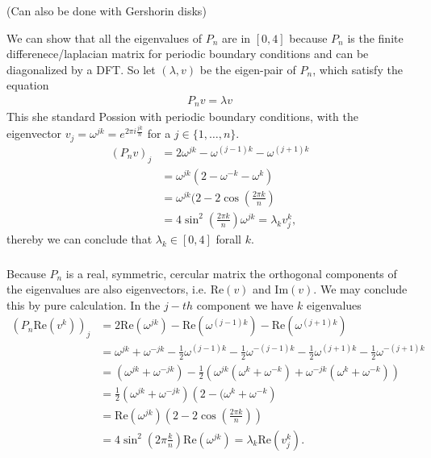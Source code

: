 \subsubsection{}
(Can also be done with Gershorin disks)
\newline

We can show that all the eigenvalues of $P_n$ are in $[0, 4]$ because $P_n$
is the finite differenece/laplacian matrix for periodic boundary conditions
and can be diagonalized by a DFT. So let $\left( \lambda, v \right)$ be the
eigen-pair of $P_n$, which satisfy the equation
\begin{align}
    P_n v = \lambda v
\end{align}
This she standard Possion with periodic boundary conditions, with the
eigenvector $v_j = \omega^{jk} = e^{2\pi i \frac{jk}{n}}$ for a $j \in
\{1,\ldots,n\}$.
\begin{align}
    (P_n v)_j
    &= 2\omega^{jk}- \omega^{(j-1)k} - \omega^{(j+1)k}\\
    &= \omega^{jk}(2 - \omega^{-k} - \omega^{k})\\
    &= \omega^{jk}(2 - 2\cos\left( \frac{2\pi k}{n} \right)\\
    &= 4\sin^2\left( \frac{2\pi k}{n} \right) \omega^{jk} = \lambda_k v^k_j,
\end{align}
thereby we can conclude that $\lambda_k \in [0, 4]$ forall $k$.
\subsubsection{}
Because $P_n$ is a real, symmetric, cercular matrix the orthogonal components
of the eigenvalues are also eigenvectors, i.e. $\text{Re}\left(v \right)$ and
$\text{Im}\left(v \right) $. We may conclude this by pure calculation. In the $j-th$
component we have $k$ eigenvalues
\begin{align}
    \left(P_n\text{Re}\left( v^k \right)\right) _j
    &= 2\text{Re}\left( \omega^{jk} \right) -\text{Re}\left( \omega^{(j-1)k}
    \right) -\text{Re}\left( \omega^{(j+1)k} \right)\\
    &= \omega^{jk} +\omega^{-jk} - \frac{1}{2}\omega^{(j-1)k}
    -\frac{1}{2}\omega^{-(j-1)k}
    -\frac{1}{2}\omega^{(j+1)k} -\frac{1}{2}\omega^{-(j+1)k}\\
    &= \left( \omega^{jk} + \omega^{-jk} \right)
    -\frac{1}{2}\left( \omega^{jk}\left(\omega^{k} + \omega^{-k} \right)
    +\omega^{-jk}\left(\omega^{k} + \omega^{-k} \right)  \right)\\
    &= \frac{1}{2}\left( \omega^{jk} + \omega^{-jk} \right)\left(
    2-(\omega^{k} + \omega^{-k}\right) \\
    &= \text{Re}\left(\omega^{jk}  \right) \left(2-2\cos\left( \frac{2\pi
    k}{n}\right)\right)\\
    &= 4\sin^2\left( 2\pi \frac{k}{n} \right) \text{Re}\left( \omega^{jk}
    \right)  = \lambda_k\text{Re}(v^k_j).
\end{align}
